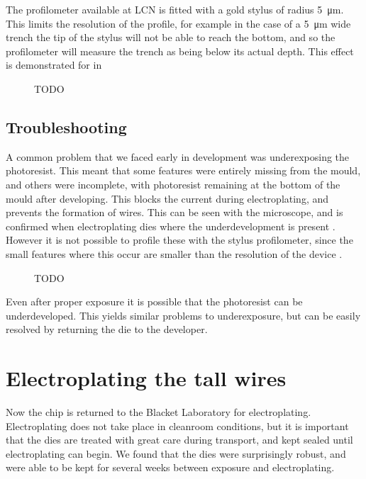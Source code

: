 The profilometer available at LCN is fitted with a gold stylus of radius
\SI{5}{\micro\meter}. This limits the resolution of the profile, for example in
the case of a \SI{5}{\micro\meter} wide trench the tip of the stylus will not
be able to reach the bottom, and so the profilometer will measure the trench as
being below its actual depth. This effect is demonstrated for  in 

\begin{figure}[h]
  \caption{TODO}
  \label{fab:fig:exampleprofile}
\end{figure}

\subsection{Troubleshooting}

A common problem that we faced early in development was underexposing the
photoresist. This meant that some features were entirely missing from the mould,
and others were incomplete, with photoresist remaining at the bottom of the
mould after developing. This blocks the current during electroplating, and
prevents the formation of wires. This can be seen with the microscope, and is
confirmed when electroplating dies where the underdevelopment is present
. However it is not possible to profile these with the
stylus profilometer, since the small features where this occur are smaller than
the resolution of the device .

\begin{figure}[h]
  \caption{TODO}
  \label{fab:fig:moulds}
\end{figure}

Even after proper exposure it is possible that the photoresist can be
underdeveloped. This yields similar problems to underexposure, but can be
easily resolved by returning the die to the developer. 


\section{Electroplating the tall wires}

Now the chip is returned to the Blacket Laboratory for electroplating.
Electroplating does not take place in cleanroom conditions, but it is important
that the dies are treated with great care during transport, and kept sealed
until electroplating can begin. We found that the dies were surprisingly
robust, and were able to be kept for several weeks between exposure and
electroplating.

